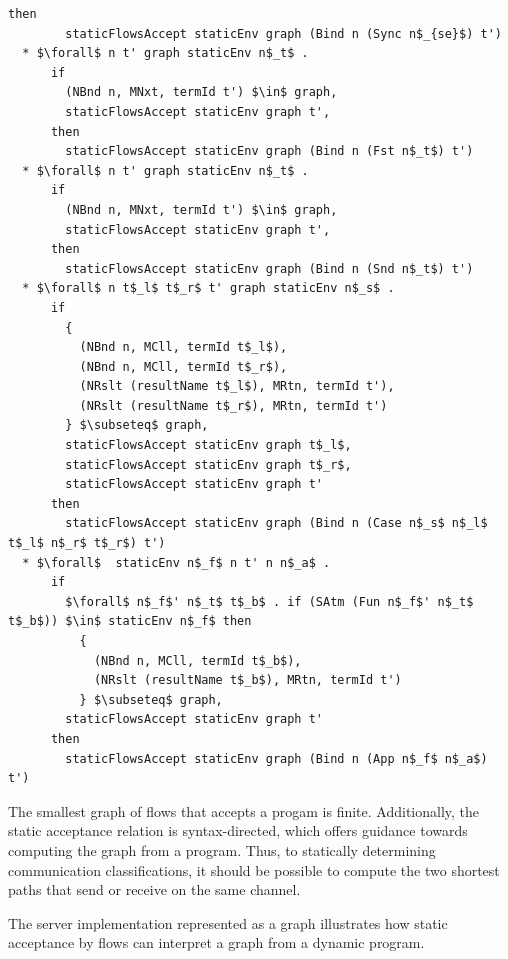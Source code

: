 \documentclass[letterpaper, 11pt]{extarticle}
\begin{document}
\begin{lstlisting}[language=logic, mathescape]
      then
        staticFlowsAccept staticEnv graph (Bind n (Sync n$_{se}$) t')
  * $\forall$ n t' graph staticEnv n$_t$ .
      if
        (NBnd n, MNxt, termId t') $\in$ graph, 
        staticFlowsAccept staticEnv graph t', 
      then
        staticFlowsAccept staticEnv graph (Bind n (Fst n$_t$) t')
  * $\forall$ n t' graph staticEnv n$_t$ .
      if
        (NBnd n, MNxt, termId t') $\in$ graph, 
        staticFlowsAccept staticEnv graph t', 
      then
        staticFlowsAccept staticEnv graph (Bind n (Snd n$_t$) t')
  * $\forall$ n t$_l$ t$_r$ t' graph staticEnv n$_s$ .
      if
        {
          (NBnd n, MCll, termId t$_l$),
          (NBnd n, MCll, termId t$_r$),
          (NRslt (resultName t$_l$), MRtn, termId t'),
          (NRslt (resultName t$_r$), MRtn, termId t')
        } $\subseteq$ graph, 
        staticFlowsAccept staticEnv graph t$_l$, 
        staticFlowsAccept staticEnv graph t$_r$,
        staticFlowsAccept staticEnv graph t'
      then
        staticFlowsAccept staticEnv graph (Bind n (Case n$_s$ n$_l$ t$_l$ n$_r$ t$_r$) t')
  * $\forall$  staticEnv n$_f$ n t' n n$_a$ .
      if
        $\forall$ n$_f$' n$_t$ t$_b$ . if (SAtm (Fun n$_f$' n$_t$ t$_b$)) $\in$ staticEnv n$_f$ then 
          {
            (NBnd n, MCll, termId t$_b$),
            (NRslt (resultName t$_b$), MRtn, termId t')
          } $\subseteq$ graph,
        staticFlowsAccept staticEnv graph t'
      then
        staticFlowsAccept staticEnv graph (Bind n (App n$_f$ n$_a$) t')
\end{lstlisting}

The smallest graph of flows that accepts a progam is finite.  Additionally, the static
acceptance relation is syntax-directed, which offers guidance towards computing the graph
from a program. Thus, to statically determining communication classifications, it should
be possible to compute the two shortest paths that send or receive on the same channel. 

The server implementation represented as a graph illustrates
how static acceptance by flows can interpret
a graph from a dynamic program.
\end{document}
